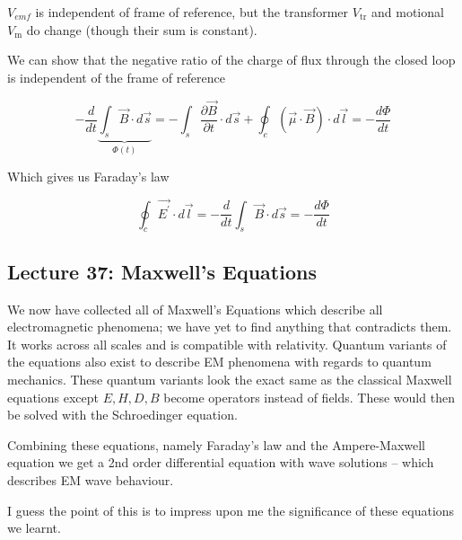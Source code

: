 \documentclass[10pt]{article}
\begin{document}
$ V_{emf} $ is independent of frame of reference, but the transformer $ V_{\text{tr}} $ and motional $ V_{\text{m}} $ do change (though their sum is constant).


We can show that the negative ratio of the charge of flux through the closed loop is independent of the frame of reference

\begin{equation}
	-\frac{d}{dt} \underbrace{\int_s \vec{B} \cdot  d \vec{s}}_{\Phi(t)}
	= - \int_s \frac{\partial \vec{B}}{\partial t} \cdot  d \vec{s} + \oint_c (\vec{\mu} \cdot  \vec{B}) \cdot  d \vec{l}
	= - \frac{d\Phi}{dt}
\end{equation}

Which gives us Faraday's law

\begin{equation}
	\oint_c \vec{E^\prime} \cdot  d \vec{l} = - \frac{d}{dt} \int_s \vec{B} \cdot  d \vec{s} = - \frac{d\Phi}{dt}
\end{equation}


\newpage
\subsection{Lecture 37: Maxwell's Equations}

\begin{blockquote}
	We now have collected all of Maxwell's Equations which describe all electromagnetic phenomena; we have yet to find anything that contradicts them. It works across all scales and is compatible with relativity. Quantum variants of the equations also exist to describe EM phenomena with regards to quantum mechanics. These quantum variants look the exact same as the classical Maxwell equations except $ E, H, D, B$ become operators instead of fields. These would then be solved with the Schroedinger equation.

	Combining these equations, namely Faraday's law and the Ampere-Maxwell equation we get a 2nd order differential equation with wave solutions -- which describes EM wave behaviour.

	I guess the point of this is to impress upon me the significance of these equations we learnt. 
\end{blockquote}
\end{document}
